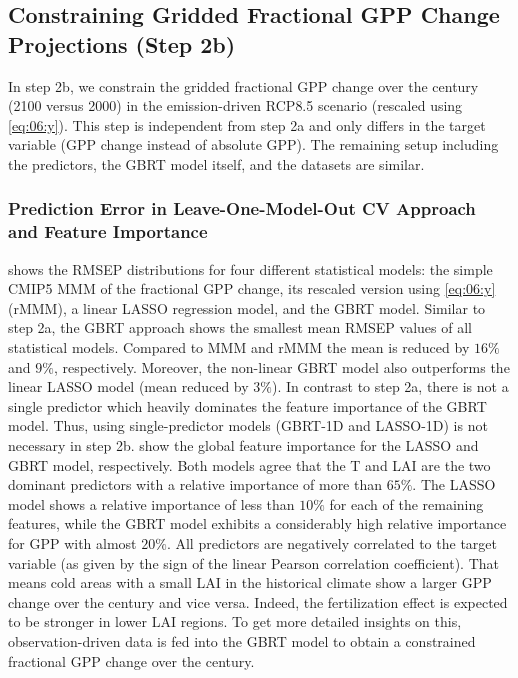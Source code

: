 \subsection{Constraining Gridded Fractional \acs{GPP} Change Projections (Step
  2b)}
\label{subsec:06:results_step2b}

In step 2b, we constrain the gridded fractional \ac{GPP} change over the
 century (2100 versus 2000) in the emission-driven \acs{RCP}8.5
scenario (rescaled using \cref{eq:06:y}). This step is independent from step 2a
and only differs in the target variable (\ac{GPP} change instead of absolute
\ac{GPP}). The remaining setup including the predictors, the \ac{GBRT} model
itself, and the datasets are similar.


\subsubsection{Prediction Error in Leave-One-Model-Out \acs{CV} Approach and
  Feature Importance}
\label{subsubsec:06:results_step2b_ml_inference}

 shows the \ac{RMSEP} distributions for four
different statistical models: the simple \acs{CMIP}5 \ac{MMM} of the fractional
\ac{GPP} change, its rescaled version using \cref{eq:06:y} (r\acs{MMM}), a
linear \ac{LASSO} regression model, and the \ac{GBRT} model. Similar to step
2a, the \ac{GBRT} approach shows the smallest mean \ac{RMSEP} values of all
statistical models. Compared to \ac{MMM} and r\acs{MMM} the mean is reduced by
$16 \unit{\%}$ and $9 \unit{\%}$, respectively. Moreover, the non-linear
\ac{GBRT} model also outperforms the linear \ac{LASSO} model (mean reduced by
$3 \unit{\%}$). In contrast to step 2a, there is not a single predictor which
heavily dominates the feature importance of the \ac{GBRT} model. Thus, using
single-predictor models (\acs{GBRT}-1D and \acs{LASSO}-1D) is not necessary in
step 2b.  show
the global feature importance for the \ac{LASSO} and \ac{GBRT} model,
respectively. Both models agree that the \acf{T} and \ac{LAI} are the two
dominant predictors with a relative importance of more than $65 \unit{\%}$. The
\ac{LASSO} model shows a relative importance of less than $10 \unit{\%}$ for
each of the remaining features, while the \ac{GBRT} model exhibits a
considerably high relative importance for \ac{GPP} with almost $20 \unit{\%}$.
All predictors are negatively correlated to the target variable (as given by
the sign of the linear Pearson correlation coefficient). That means cold areas
with a small \ac{LAI} in the historical climate show a larger \ac{GPP} change
over the  century and vice versa. Indeed, the fertilization effect is
expected to be stronger in lower \ac{LAI} regions. To get more detailed
insights on this, observation-driven data is fed into the \ac{GBRT} model to
obtain a constrained fractional \ac{GPP} change over the  century.

